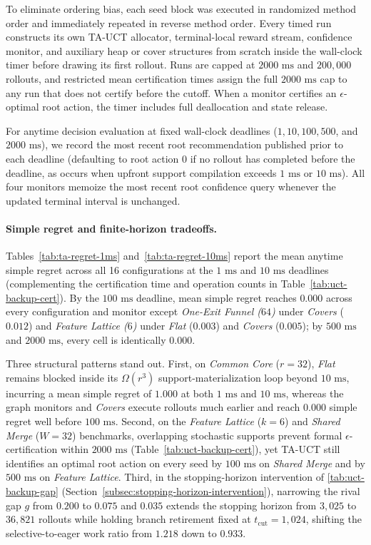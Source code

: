 \documentclass{article}
\theoremstyle{plain}
\theoremstyle{definition}
\begin{document}
To eliminate ordering bias, each seed block was executed in randomized method order and immediately repeated in reverse method order. Every timed run constructs its own TA-UCT allocator, terminal-local reward stream, confidence monitor, and auxiliary heap or cover structures from scratch inside the wall-clock timer before drawing its first rollout. Runs are capped at $2000\text{ ms}$ and $200{,}000$ rollouts, and restricted mean certification times assign the full $2000\text{ ms}$ cap to any run that does not certify before the cutoff. When a monitor certifies an $\epsilon$-optimal root action, the timer includes full deallocation and state release.

For anytime decision evaluation at fixed wall-clock deadlines ($1, 10, 100, 500$, and $2000\text{ ms}$), we record the most recent root recommendation published prior to each deadline (defaulting to root action $0$ if no rollout has completed before the deadline, as occurs when upfront support compilation exceeds $1\text{ ms}$ or $10\text{ ms}$). All four monitors memoize the most recent root confidence query whenever the updated terminal interval is unchanged.

\paragraph{Simple regret and finite-horizon tradeoffs.}

Tables~\ref{tab:ta-regret-1ms} and~\ref{tab:ta-regret-10ms} report the mean anytime simple regret across all 16 configurations at the $1\text{ ms}$ and $10\text{ ms}$ deadlines (complementing the certification time and operation counts in Table~\ref{tab:uct-backup-cert}). By the $100\text{ ms}$ deadline, mean simple regret reaches $0.000$ across every configuration and monitor except \emph{One-Exit Funnel ($64$)} under \emph{Covers} ($0.012$) and \emph{Feature Lattice ($6$)} under \emph{Flat} ($0.003$) and \emph{Covers} ($0.005$); by $500\text{ ms}$ and $2000\text{ ms}$, every cell is identically $0.000$.

Three structural patterns stand out. First, on \emph{Common Core} ($r = 32$), \emph{Flat} remains blocked inside its $\Omega(r^3)$ support-materialization loop beyond $10\text{ ms}$, incurring a mean simple regret of $1.000$ at both $1\text{ ms}$ and $10\text{ ms}$, whereas the graph monitors and \emph{Covers} execute rollouts much earlier and reach $0.000$ simple regret well before $100\text{ ms}$. Second, on the \emph{Feature Lattice} ($k=6$) and \emph{Shared Merge} ($W=32$) benchmarks, overlapping stochastic supports prevent formal $\epsilon$-certification within $2000\text{ ms}$ (Table~\ref{tab:uct-backup-cert}), yet TA-UCT still identifies an optimal root action on every seed by $100\text{ ms}$ on \emph{Shared Merge} and by $500\text{ ms}$ on \emph{Feature Lattice}. Third, in the stopping-horizon intervention of \cref{tab:uct-backup-gap} (Section~\ref{subsec:stopping-horizon-intervention}), narrowing the rival gap $g$ from $0.200$ to $0.075$ and $0.035$ extends the stopping horizon from $3{,}025$ to $36{,}821$ rollouts while holding branch retirement fixed at $t_{\mathrm{cut}}=1{,}024$, shifting the selective-to-eager work ratio from $1.218$ down to $0.933$.
\end{document}
